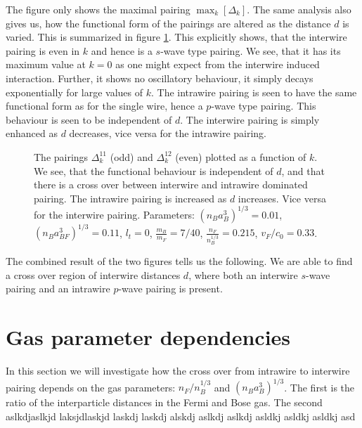 The figure only shows the maximal pairing $\max_k[\Delta_k]$. The same analysis also gives us, how the functional form of the pairings are altered as the distance $d$ is varied. This is summarized in figure \ref{fig.pairingkdependT0dvaried}. This explicitly shows, that the interwire pairing is even in $k$ and hence is a $s$-wave type pairing. We see, that it has its maximum value at $k=0$ as one might expect from the interwire induced interaction. Further, it shows no oscillatory behaviour, it simply decays exponentially for large values of $k$. The intrawire pairing is seen to have the same functional form as for the single wire, hence a $p$-wave type pairing. This behaviour is seen to be independent of $d$. The interwire pairing is simply enhanced as $d$ decreases, vice versa for the intrawire pairing.  

\begin{figure} 
\begin{center}  
  
\caption{The pairings $\Delta^{11}_k$ (odd) and $\Delta^{12}_k$ (even) plotted as a function of $k$. We see, that the functional behaviour is independent of $d$, and that there is a cross over between interwire and intrawire dominated pairing. The intrawire pairing is increased as $d$ increases. Vice versa for the interwire pairing. Parameters: $(n_Ba_B^3)^{1/3} = 0.01$, $(n_Ba_{BF}^3)^{1/3} = 0.11$, $l_t = 0$, $\frac{m_B}{m_F} = 7/40$, $\frac{n_F}{n_B^{1/3}} = 0.215$, $v_F/c_0 = 0.33$. }  
\label{fig.pairingkdependT0dvaried}  
\end{center}    
\end{figure}

The combined result of the two figures tells us the following. We are able to find a cross over region of interwire distances $d$, where both an interwire $s$-wave pairing and an intrawire $p$-wave pairing is present.

\section{Gas parameter dependencies}
In this section we will investigate how the cross over from intrawire to interwire pairing depends on the gas parameters: $n_F/n_B^{1/3}$ and $(n_Ba_B^3)^{1/3}$. The first is the ratio of the interparticle distances in the Fermi and Bose gas. The second  aslkdjaslkjd laksjdlaskjd laskdj laskdj alskdj aslkdj aslkdj asldkj asldkj asldkj asd



